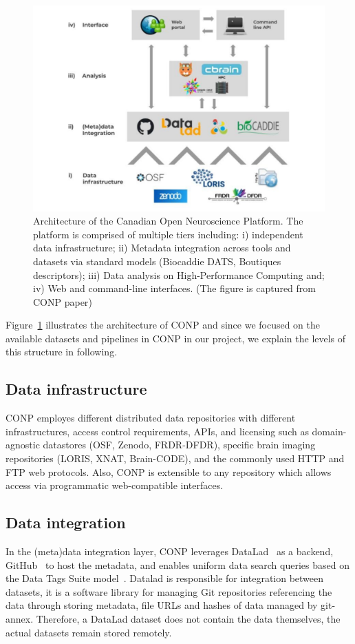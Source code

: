 \begin{figure}
    \centering
    \includegraphics[width=\textwidth]{figures/CONP_figure.pdf}
    \caption{Architecture of the Canadian Open Neuroscience Platform. The platform is comprised of multiple tiers including:  i) independent data infrastructure; ii) Metadata integration across tools and datasets via standard models (Biocaddie DATS, Boutiques descriptors); iii) Data analysis on High-Performance Computing and; iv) Web and command-line interfaces. (The figure is captured from CONP paper\cite{CONP})}
    \label{fig:CONP_figure}
\end{figure}

Figure~\ref{fig:CONP_figure} illustrates the architecture of CONP and since we focused on the available datasets and pipelines in CONP in our project, we explain the levels of this structure in following. 

\subsection{Data infrastructure}
CONP employes different distributed data repositories with different infrastructures, access control requirements, APIs, and licensing such as domain-agnostic datastores (OSF, Zenodo, FRDR-DFDR), specific brain imaging repositories (LORIS, XNAT, Brain-CODE), and the commonly used HTTP and FTP web protocols. Also, CONP is extensible to any repository which allows access via programmatic web-compatible interfaces.

\subsection{Data integration}
In the (meta)data integration layer, CONP leverages DataLad~\cite{} as a backend, GitHub~\cite{} to host the metadata, and enables uniform data search queries based on the Data Tags Suite model~\cite{}. Datalad is responsible for integration between datasets, it is a software library for managing Git repositories referencing the data through storing metadata, file URLs and hashes of data managed by git-annex. Therefore, a DataLad dataset does not contain the data themselves, the actual datasets remain stored remotely.

